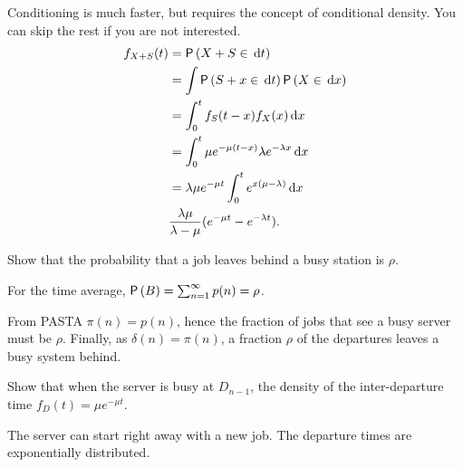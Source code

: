 \begin{exercise}
\begin{solution}
Conditioning is much faster, but requires the concept of conditional density. You can skip the rest if you are not interested. 
    \begin{align*}
    f_{X+S}(t) 
&= \P{X+S\in \d{t}} \\
&= \int \P{S+x\in \d{t}}\P{X\in \d{x}} \\
&=\int_0^t f_S(t-x) f_X(x) \d{x} \\
     &= \int_0^t \mu e^{-\mu(t-x)} \lambda e^{-\lambda x} \d{x} \\
     &= \lambda \mu e^{-\mu t} \int_0^t  e^{x(\mu-\lambda)} \d{x} \\
& \frac{\lambda \mu}{\lambda - \mu} (e^{-\mu t} - e^{-\lambda t}).
    \end{align*}
    \end{solution}
\end{exercise}

\begin{exercise}
Show that the probability that a job leaves behind a busy station is $\rho$.
    \begin{solution}
For the time average, 
        $\P B = \sum_{n=1}^\infty p(n) = \rho$.
    \end{solution}
From PASTA $\pi(n) = p(n)$, hence the fraction of jobs that see a busy server must be $\rho$. Finally, as $\delta(n) = \pi(n)$, a fraction $\rho$ of the departures leaves a busy system behind.
\end{exercise}

\begin{exercise}
Show  that when the server is busy at $D_{n-1}$, the density of the inter-departure time  $f_D(t) = \mu e^{-\mu t}$.
    \begin{solution}
The server can start right away with a new job. The departure times are exponentially distributed. 
    \end{solution}
\end{exercise}

